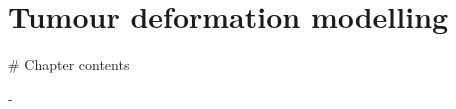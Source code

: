 \chapter{Tumour deformation modelling}
\label{chapterlabel3}

\begin{markdown}

  # Chapter contents

  -

\end{markdown}